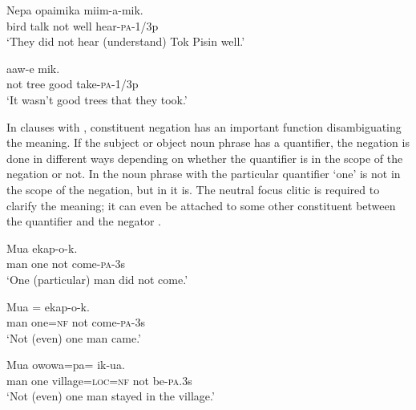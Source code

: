 \ea%
\label{ex:x1104}
\gll Nepa  opaimika      miim-a-mik. \\
bird  talk  not  well  hear-\textsc{pa}-1/3p\\
\glt `They did not hear (understand) Tok Pisin well.'
\z

\ea%
\label{ex:x1105}
\gll {}     aaw-e\textstyleEmphasizedVernacularWords{-} mik. \\
not  tree  good  take-\textsc{pa}-1/3p\\
\glt `It wasn't good trees that they took.'
\z

In clauses with , constituent negation has an important function disambiguating the meaning. If the subject or object noun phrase has a quantifier, the negation is done in different ways depending on whether the quantifier is in the scope of the negation or not. In  the noun phrase with the particular quantifier  `one' is not in the scope of the negation, but in  it is. The neutral focus clitic is required to clarify the meaning; it can even be attached to some other constituent between the quantifier and the negator .

\ea%
\label{ex:x1142}
\gll Mua      ekap-o-k. \\
man  one  not  come-\textsc{pa}-3s\\
\glt `One (particular) man did not come.'
\z

\ea%
\label{ex:x1143}
\gll Mua  =    ekap-o-k. \\
man  one=\textsc{nf}  not  come-\textsc{pa}-3s\\
\glt `Not (even) one man came.'
\z

\ea%
\label{ex:x1147}
\gll Mua    owowa=pa=    ik-ua. \\
man  one  village=\textsc{loc}=\textsc{nf}  not  be-\textsc{pa}.3s\\
\glt `Not (even) one man stayed in the village.'
\z


